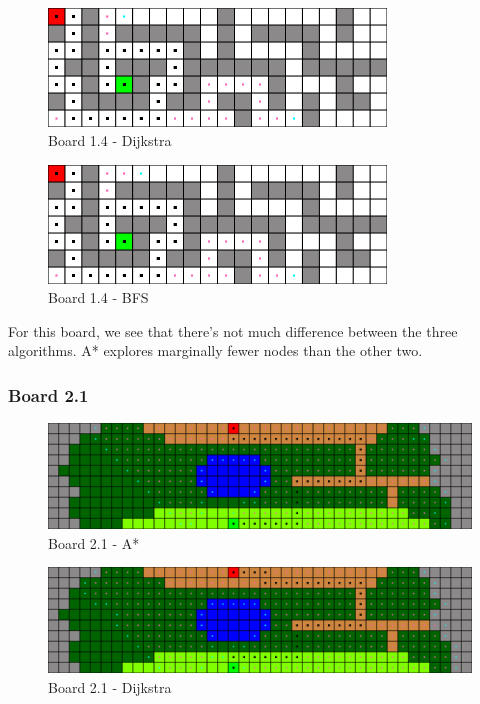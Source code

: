 \begin{figure}[h!]
  \centering
    \includegraphics[width=0.8\textwidth]{img/board-1-4-dijkstra}
    \caption{Board 1.4 - Dijkstra}
\end{figure}

\begin{figure}[h!]
  \centering
    \includegraphics[width=0.8\textwidth]{img/board-1-4-bfs}
    \caption{Board 1.4 - BFS}
\end{figure}

For this board, we see that there's not much difference between the three
algorithms. A* explores marginally fewer nodes than the other two.

\clearpage

\subsubsection*{Board 2.1}

\begin{figure}[h!]
  \centering
    \includegraphics[width=\textwidth]{img/board-2-1-astar}
    \caption{Board 2.1 - A*}
\end{figure}

\begin{figure}[h!]
  \centering
    \includegraphics[width=\textwidth]{img/board-2-1-dijkstra}
    \caption{Board 2.1 - Dijkstra}
\end{figure}

